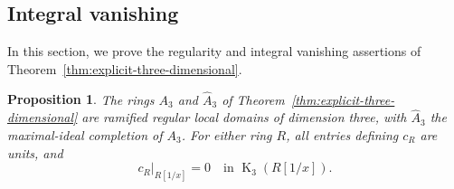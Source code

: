 \documentclass[11pt,a4paper]{amsart}
\numberwithin{equation}{section}
\newtheorem{proposition}[theorem]{Proposition}
\theoremstyle{definition}
\theoremstyle{remark}
\DeclareMathOperator{\CthreeK}{K}
\begin{document}
\subsection{Integral vanishing}\label{c3:sec:integral}

In this section, we prove the regularity and integral vanishing
assertions of Theorem~\ref{thm:explicit-three-dimensional}.

\begin{proposition}\label{c3:prop:integral}
The rings $A_3$ and $\widehat A_3$ of
Theorem~\ref{thm:explicit-three-dimensional} are ramified regular local
domains of dimension three, with $\widehat A_3$ the maximal-ideal
completion of $A_3$. For either ring $R$, all entries defining $c_R$
are units, and
\[
 c_R|_{R[1/x]}=0\quad\text{in }\CthreeK_3(R[1/x]).
\]
\end{proposition}
\end{document}
